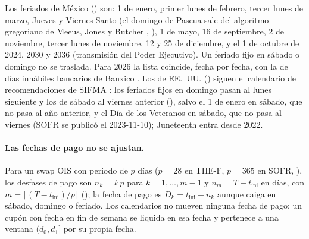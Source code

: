Los feriados de México () son: 1 de enero, primer lunes de febrero, tercer lunes de marzo, Jueves y Viernes Santo (el domingo de Pascua sale del algoritmo gregoriano de Meeus, Jones y Butcher \citep{meeus1998}, ), 1 de mayo, 16 de septiembre, 2 de noviembre, tercer lunes de noviembre, 12 y 25 de diciembre, y el 1 de octubre de 2024, 2030 y 2036 (transmisión del Poder Ejecutivo). Un feriado fijo en sábado o domingo no se traslada. Para 2026 la lista coincide, fecha por fecha, con la de días inhábiles bancarios de Banxico \citep{banxico2026c}. Los de EE.~UU. () siguen el calendario de recomendaciones de SIFMA \citep{sifma2026}: los feriados fijos en domingo pasan al lunes siguiente y los de sábado al viernes anterior (), salvo el 1 de enero en sábado, que no pasa al año anterior, y el Día de los Veteranos en sábado, que no pasa al viernes (SOFR se publicó el 2023-11-10); Juneteenth entra desde 2022.

\paragraph{Las fechas de pago no se ajustan.} Para un swap OIS con periodo de $p$ días ($p = 28$ en TIIE-F, $p = 365$ en SOFR, ), los desfases de pago son $n_k = k\,p$ para $k = 1, \dots, m - 1$ y $n_m = T - t_{\mathrm{ini}}$ en días, con $m = \lceil (T - t_{\mathrm{ini}})/p \rceil$ (); la fecha de pago es $D_k = t_{\mathrm{ini}} + n_k$ aunque caiga en sábado, domingo o feriado. Los calendarios no mueven ninguna fecha de pago: un cupón con fecha en fin de semana se liquida en esa fecha y pertenece a una ventana $(d_0, d_1]$ por su propia fecha.

